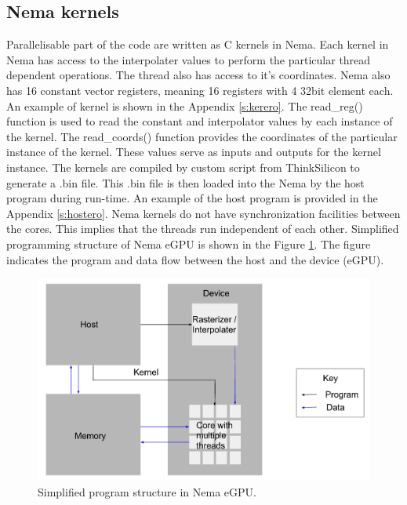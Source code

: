 \subsection{Nema kernels}
\label{s:gpusw:nkernels}

 Parallelisable part of the code are written as C kernels in Nema. Each kernel in Nema has access to the interpolater values to perform the particular thread dependent operations. The thread also has access to it's coordinates. Nema also has 16 constant vector registers, meaning 16 registers with 4 32bit element each. An example of kernel is shown in the Appendix \ref{s:kerero}. The read\_reg() function is used to read the constant and interpolator values by each instance of the kernel. The read\_coords() function provides the coordinates of the particular instance of the kernel. These values serve as inputs and outputs for the kernel instance. The kernels are compiled by custom script from ThinkSilicon to generate a .bin file. This .bin file is then loaded into the Nema by the host program during run-time. An example of the host program is provided in the Appendix \ref{s:hostero}. Nema kernels do not have synchronization facilities between the cores. This implies that the threads run independent of each other. Simplified programming structure of Nema eGPU is shown in the Figure \ref{fig:kernelstruct}. The figure indicates the program and data flow between the host and the device (eGPU).

 \begin{figure}
    \center
    \includegraphics[width=.8\linewidth]{figures/kernelstruct}
    \caption{Simplified program structure in Nema eGPU.}
    \label{fig:kernelstruct}
\end{figure}


